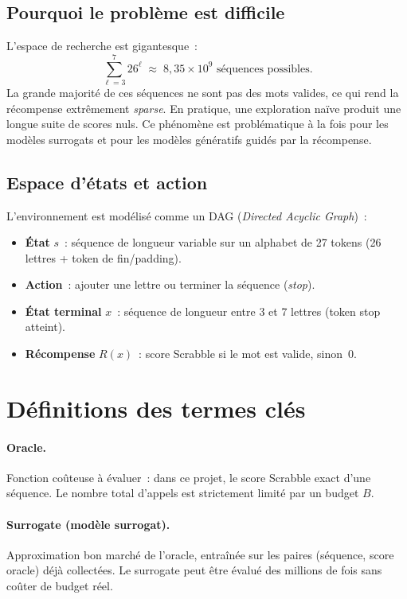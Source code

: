 \documentclass[10pt]{article}
\begin{document}
\subsection{Pourquoi le problème est difficile}
L'espace de recherche est gigantesque~:
\[
  \sum_{\ell=3}^{7} 26^\ell \;\approx\; 8{,}35 \times 10^9 \text{ séquences possibles.}
\]
La grande majorité de ces séquences ne sont pas des mots valides, ce qui rend la récompense extrêmement \emph{sparse}. En pratique, une exploration naïve produit une longue suite de scores nuls. Ce phénomène est problématique à la fois pour les modèles surrogats et pour les modèles génératifs guidés par la récompense.

\subsection{Espace d'états et action}
L'environnement est modélisé comme un DAG (\emph{Directed Acyclic Graph})~:
\begin{itemize}[noitemsep]
  \item \textbf{État} $s$~: séquence de longueur variable sur un alphabet de 27 tokens (26 lettres + token de fin/padding).
  \item \textbf{Action}~: ajouter une lettre ou terminer la séquence (\emph{stop}).
  \item \textbf{État terminal} $x$~: séquence de longueur entre 3 et 7 lettres (token stop atteint).
  \item \textbf{Récompense} $R(x)$~: score Scrabble si le mot est valide, sinon~$0$.
\end{itemize}

\section{Définitions des termes clés}

\paragraph{Oracle.}
Fonction coûteuse à évaluer~: dans ce projet, le score Scrabble exact d'une séquence. Le nombre total d'appels est strictement limité par un budget $B$.

\paragraph{Surrogate (modèle surrogat).}
Approximation bon marché de l'oracle, entraînée sur les paires (séquence, score oracle) déjà collectées. Le surrogate peut être évalué des millions de fois sans coûter de budget réel.
\end{document}
